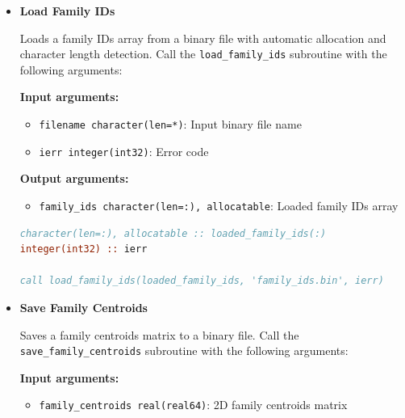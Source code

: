 \begin{enumerate}
\begin{itemize}
\begin{lstlisting}[language=Fortran, caption={Save Family IDs}]
call save_family_ids(family_ids, 'family_ids.bin', ierr)
                  \end{lstlisting}
                  
            \item \textbf{Load Family IDs}
                  
                  Loads a family IDs array from a binary file with automatic allocation and
                  character length detection. Call the \texttt{load\_family\_ids} subroutine
                  with the following arguments:
                  
                  \textbf{Input arguments:}
                  \begin{itemize}
                    \item \texttt{filename character(len=*)}: Input binary file name
                          
                    \item \texttt{ierr integer(int32)}: Error code
                  \end{itemize}
                  \textbf{Output arguments:}
                  \begin{itemize}
                    \item \texttt{family\_ids character(len=:), allocatable}: Loaded family
                          IDs array
                  \end{itemize}
                  \begin{lstlisting}[language=Fortran, caption={Load Family IDs}]
character(len=:), allocatable :: loaded_family_ids(:)
integer(int32) :: ierr

call load_family_ids(loaded_family_ids, 'family_ids.bin', ierr)
                  \end{lstlisting}
                  
            \item \textbf{Save Family Centroids}
                  
                  Saves a family centroids matrix to a binary file. Call the \texttt{save\_family\_centroids}
                  subroutine with the following arguments:
                  
                  \textbf{Input arguments:}
                  \begin{itemize}
                    \item \texttt{family\_centroids real(real64)}: 2D family centroids matrix
                          

\end{itemize}
\end{itemize}
\end{enumerate}
